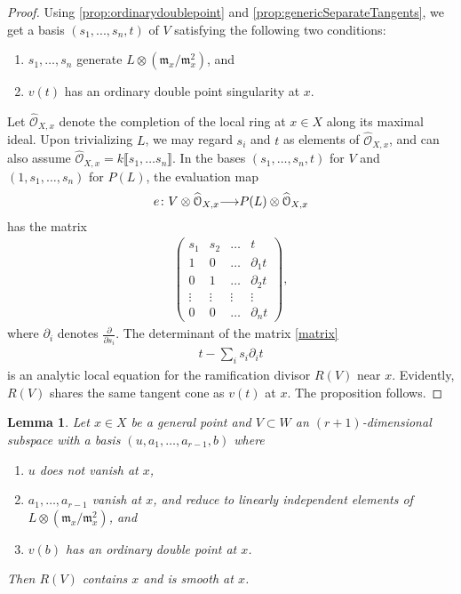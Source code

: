 \documentclass[11pt,reqno]{amsart}
\theoremstyle{plain}
\newtheorem{lemma}[theorem]{Lemma}
\theoremstyle{definition}
\theoremstyle{remark}
\numberwithin{equation}{section}
\renewcommand{\to}{{\longrightarrow}}
\numberwithin{equation}{section}
\renewcommand{\O}{\mathcal O}
\begin{document}
\begin{proof}
  Using \autoref{prop:ordinarydoublepoint} and \autoref{prop:genericSeparateTangents}, we get a basis $(s_{1}, ..., s_{n}, t)$ of $V$ satisfying the following two conditions:
  \begin{enumerate}
      \item $s_{1}, \dots, s_{n}$ generate $L \otimes ({\mathfrak m}_{x}/{\mathfrak m}^{2}_{x})$, and
      \item $v(t)$ has an ordinary double point singularity at $x$.
    \end{enumerate}  

    Let $\widehat{\O}_{X,x}$ denote the completion of the local ring at $x \in X$ along its maximal ideal.  Upon trivializing $L$, we may regard $s_{i}$ and $t$ as elements of $\widehat{\O}_{X,x}$, and can also assume  $\widehat{\O}_{X,x} = k\llbracket s_{1}, \dots s_{n}\rrbracket$.
    In the bases $(s_1, \dots, s_n, t)$ for $V$ and $(1, s_1, \dots, s_n)$ for $P(L)$, the evaluation map 
\begin{align*}
  e\from V \otimes \widehat{\O}_{X,x} \to P(L) \otimes \widehat{\O}_{X,x}
\end{align*}
has the matrix
\begin{align}\label{matrix}
\begin{pmatrix}
  s_{1} & s_{2} & \dots & t \\
  1 & 0 & \dots & \partial_{1}t \\
  0 & 1 & \dots & \partial_{2}t \\
  \vdots & \vdots & \vdots & \vdots \\
  0 & 0 & \dots & \partial_{n}t
\end{pmatrix},
\end{align}
where $\partial_{i}$ denotes $\frac{\partial}{\partial s_{i}}$.
The determinant of the matrix \eqref{matrix}
\begin{align*}
  t - \sum_{i}s_{i}\partial_{i}t
\end{align*}
is an analytic local equation for the ramification divisor $R(V)$ near $x$.
Evidently, $R(V)$ shares the same tangent cone as $v(t)$ at $x$.
The proposition follows.
\end{proof}

\begin{lemma}\label{lem:basepointfree}
  Let $x \in X$ be a general point and $V \subset W$ an $(r+1)$-dimensional subspace with a basis $(u, a_1,\dots, a_{r-1},b)$ where
  \begin{enumerate}
    \item $u$ does not vanish at $x$,
    \item $a_1, \dots , a_{r-1}$ vanish at $x$, and reduce to linearly independent elements of $L \otimes ({\mathfrak m}_{x}/{\mathfrak m}^{2}_{x})$, and
    \item $v(b)$ has an ordinary double point at $x$. 
  \end{enumerate}
  Then $R(V)$ contains $x$ and is smooth at $x$.
\end{lemma}
\end{document}

